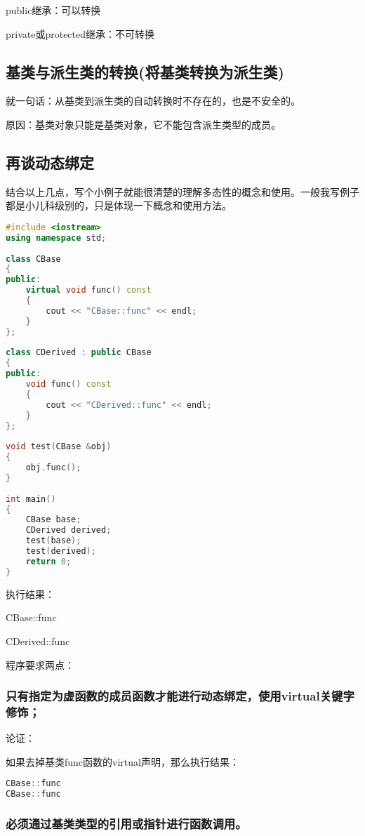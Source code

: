 \documentclass{article}
\begin{document}
public继承：可以转换

private或protected继承：不可转换
\subsection{基类与派生类的转换(将基类转换为派生类)}
\label{sec-8-4}

就一句话：从基类到派生类的自动转换时不存在的，也是不安全的。

原因：基类对象只能是基类对象，它不能包含派生类型的成员。
\subsection{再谈动态绑定}
\label{sec-8-5}

结合以上几点，写个小例子就能很清楚的理解多态性的概念和使用。一般我写例子都是小儿科级别的，只是体现一下概念和使用方法。
\begin{lstlisting}[language=c++]
#include <iostream>    
using namespace std;  
  
class CBase  
{  
public:  
    virtual void func() const  
    {  
        cout << "CBase::func" << endl;  
    }  
};  
  
class CDerived : public CBase  
{  
public:  
    void func() const  
    {  
        cout << "CDerived::func" << endl;  
    }  
};  
  
void test(CBase &obj)  
{  
    obj.func();  
}  
  
int main()  
{  
    CBase base;  
    CDerived derived;  
    test(base);  
    test(derived);  
    return 0;  
}  
\end{lstlisting}
执行结果：

CBase::func

CDerived::func

程序要求两点：
\subsubsection{只有指定为虚函数的成员函数才能进行动态绑定，使用virtual关键字修饰；}
\label{sec-8-5-1}

论证：

如果去掉基类func函数的virtual声明，那么执行结果：
\begin{lstlisting}[language=c++]
CBase::func
CBase::func
\end{lstlisting}
\subsubsection{必须通过基类类型的引用或指针进行函数调用。}
\label{sec-8-5-2}
\end{document}
